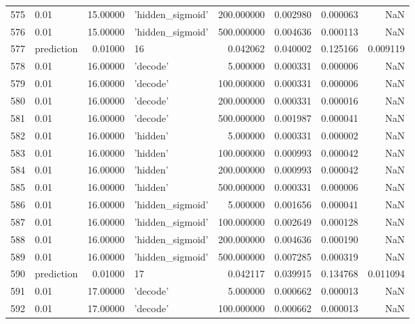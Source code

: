 \documentclass[10pt,a4paper]{article}
\begin{document}
\begin{tabular}{llrlrrrr}
575  &        0.01 &  15.00000 &   'hidden\_sigmoid' &  200.000000 &  0.002980 &  0.000063 &       NaN \\
576  &        0.01 &  15.00000 &   'hidden\_sigmoid' &  500.000000 &  0.004636 &  0.000113 &       NaN \\
577  &  prediction &   0.01000 &                 16 &    0.042062 &  0.040002 &  0.125166 &  0.009119 \\
578  &        0.01 &  16.00000 &           'decode' &    5.000000 &  0.000331 &  0.000006 &       NaN \\
579  &        0.01 &  16.00000 &           'decode' &  100.000000 &  0.000331 &  0.000006 &       NaN \\
580  &        0.01 &  16.00000 &           'decode' &  200.000000 &  0.000331 &  0.000016 &       NaN \\
581  &        0.01 &  16.00000 &           'decode' &  500.000000 &  0.001987 &  0.000041 &       NaN \\
582  &        0.01 &  16.00000 &           'hidden' &    5.000000 &  0.000331 &  0.000002 &       NaN \\
583  &        0.01 &  16.00000 &           'hidden' &  100.000000 &  0.000993 &  0.000042 &       NaN \\
584  &        0.01 &  16.00000 &           'hidden' &  200.000000 &  0.000993 &  0.000042 &       NaN \\
585  &        0.01 &  16.00000 &           'hidden' &  500.000000 &  0.000331 &  0.000006 &       NaN \\
586  &        0.01 &  16.00000 &   'hidden\_sigmoid' &    5.000000 &  0.001656 &  0.000041 &       NaN \\
587  &        0.01 &  16.00000 &   'hidden\_sigmoid' &  100.000000 &  0.002649 &  0.000128 &       NaN \\
588  &        0.01 &  16.00000 &   'hidden\_sigmoid' &  200.000000 &  0.004636 &  0.000190 &       NaN \\
589  &        0.01 &  16.00000 &   'hidden\_sigmoid' &  500.000000 &  0.007285 &  0.000319 &       NaN \\
590  &  prediction &   0.01000 &                 17 &    0.042117 &  0.039915 &  0.134768 &  0.011094 \\
591  &        0.01 &  17.00000 &           'decode' &    5.000000 &  0.000662 &  0.000013 &       NaN \\
592  &        0.01 &  17.00000 &           'decode' &  100.000000 &  0.000662 &  0.000013 &       NaN \\

\end{tabular}
\end{document}
